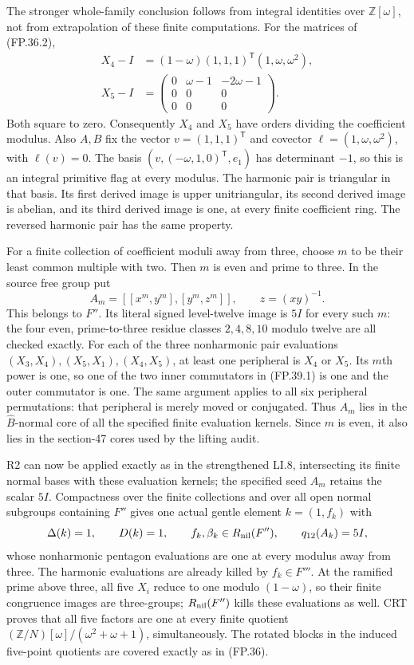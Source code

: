 The stronger whole-family conclusion follows from integral
identities over $\mathbb Z[\omega]$, not from extrapolation of
these finite computations. For the matrices of (FP.36.2),
\[
\begin{split}
 X_4-I&=(1-\omega)(1,1,1)^{\mathsf T}(1,\omega,\omega^2),\\
 X_5-I&=\begin{pmatrix}0&\omega-1&-2\omega-1\\0&0&0\\0&0&0\end{pmatrix}.
\end{split}
\]
Both square to zero. Consequently $X_4$ and $X_5$ have orders
dividing the coefficient modulus. Also $A,B$ fix the vector
$v=(1,1,1)^{\mathsf T}$ and covector
$\ell=(1,\omega,\omega^2)$, with $\ell(v)=0$.
The basis $(v,(-\omega,1,0)^{\mathsf T},e_1)$ has determinant
$-1$, so this is an integral primitive flag at every modulus.
The harmonic pair is triangular in that basis. Its first
derived image is upper unitriangular, its second derived image
is abelian, and its third derived image is one, at every finite
coefficient ring. The reversed harmonic pair has the same property.

For a finite collection of coefficient moduli away from three,
choose $m$ to be their least common multiple with two. Then
$m$ is even and prime to three. In the source free group put
\[
             A_m=[[x^m,y^m],[y^m,z^m]],
                      \qquad z=(xy)^{-1}.
 \tag{FP.39.1}
\]
This belongs to $F''$. Its literal signed level-twelve image is
$5I$ for every such $m$: the four even, prime-to-three residue
classes $2,4,8,10$ modulo twelve are all checked exactly.
For each of the three nonharmonic pair evaluations
$(X_3,X_4),(X_5,X_1),(X_4,X_5)$, at least one peripheral
is $X_4$ or $X_5$. Its $m$th power is one, so one of the two
inner commutators in (FP.39.1) is one and the outer commutator
is one. The same argument applies to all six peripheral
permutations: that peripheral is merely moved or conjugated.
Thus $A_m$ lies in the $\widehat B$-normal core of all the
specified finite evaluation kernels. Since $m$ is even, it
also lies in the section-47 cores used by the lifting audit.

R2 can now be applied exactly as in the strengthened LI.8,
intersecting its finite normal bases with these evaluation
kernels; the specified seed $A_m$ retains the scalar $5I$.
Compactness over the finite collections and over all open normal
subgroups containing $F''$ gives one actual gentle element
$k=(1,f_k)$ with
\[
 \Delta(k)=1,\qquad D(k)=1,
 \qquad f_k,\beta_k\in R_{\rm nil}(F''),
 \qquad q_{12}(A_k)=5I,
\]
whose nonharmonic pentagon evaluations are one at every modulus
away from three. The harmonic evaluations are already killed by
$f_k\in F'''$. At the ramified prime above three, all five
$X_i$ reduce to one modulo $(1-\omega)$, so their finite
congruence images are three-groups; $R_{\rm nil}(F'')$ kills
these evaluations as well. CRT proves that all five factors
are one at every finite quotient
$(\mathbb Z/N)[\omega]/(\omega^2+\omega+1)$, simultaneously.
The rotated blocks in the induced five-point quotients are
covered exactly as in (FP.36).

